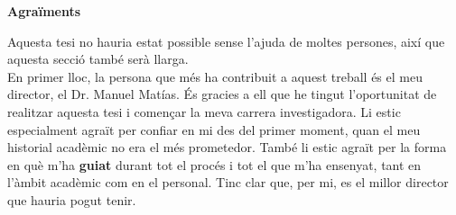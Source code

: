 \begin{center}
    \textbf{\Large Agraïments}
\end{center}

{
\parindent=0pt

Aquesta tesi no hauria estat possible sense l'ajuda de moltes persones, així
que aquesta secció també serà llarga. \\

En primer lloc, la persona que més ha contribuit a aquest treball és el meu
director, el Dr. Manuel Matías. És gracies a ell que he tingut l'oportunitat de
realitzar aquesta tesi i començar la meva carrera investigadora. Li estic
especialment agraït per confiar en mi des del primer moment, quan el meu
historial acadèmic no era el més prometedor. També li estic agraït per la forma
en què m'ha \textbf{guiat} durant tot el procés i tot el que m'ha ensenyat,
tant en l'àmbit acadèmic com en el personal. Tinc clar que, per mi, es el
millor director que hauria pogut tenir. \\

}
